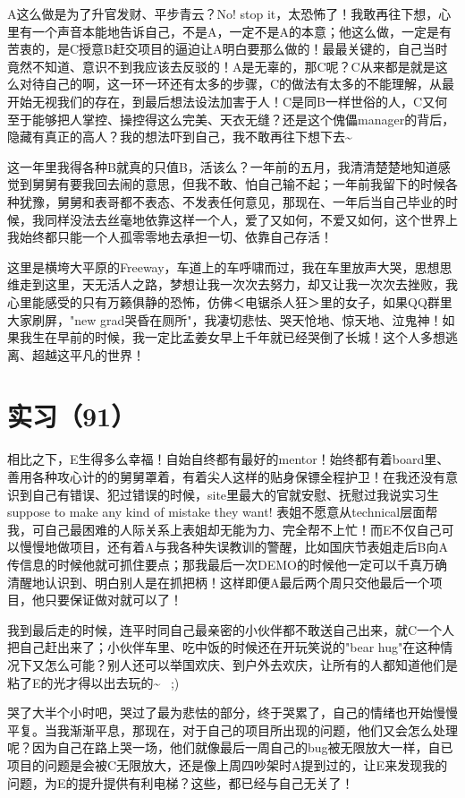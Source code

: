 \documentclass[12pt]{book}
\begin{document}
A这么做是为了升官发财、平步青云？No! stop it，太恐怖了！我敢再往下想，心里有一个声音本能地告诉自己，不是A，一定不是A的本意；他这么做，一定是有苦衷的，是C授意B赶交项目的逼迫让A明白要那么做的！最最关键的，自己当时竟然不知道、意识不到我应该去反驳的！A是无辜的，那C呢？C从来都是就是这么对待自己的啊，这一环一环还有太多的步骤，C的做法有太多的不能理解，从最开始无视我们的存在，到最后想法设法加害于人！C是同B一样世俗的人，C又何至于能够把人掌控、操控得这么完美、天衣无缝？还是这个傀儡manager的背后，隐藏有真正的高人？我的想法吓到自己，我不敢再往下想下去\textasciitilde{}~

这一年里我得各种B就真的只值B，活该么？一年前的五月，我清清楚楚地知道感觉到舅舅有要我回去闹的意思，但我不敢、怕自己输不起；一年前我留下的时候各种犹豫，舅舅和表哥都不表态、不发表任何意见，那现在、一年后当自己毕业的时候，我同样没法去丝毫地依靠这样一个人，爱了又如何，不爱又如何，这个世界上我始终都只能一个人孤零零地去承担一切、依靠自己存活！

这里是横垮大平原的Freeway，车道上的车呼啸而过，我在车里放声大哭，思想思维走到这里，天无活人之路，梦想让我一次次去努力，却又让我一次次去挫败，我心里能感受的只有万籁俱静的恐怖，仿佛＜电锯杀人狂＞里的女子，如果QQ群里大家刷屏，"new grad哭昏在厕所"，我凄切悲怯、哭天怆地、惊天地、泣鬼神！如果我生在早前的时候，我一定比孟姜女早上千年就已经哭倒了长城！这个人多想逃离、超越这平凡的世界！


\section{实习（91）　}
\label{sec-5-94}

相比之下，E生得多么幸福！自始自终都有最好的mentor！始终都有着board里、善用各种攻心计的的舅舅罩着，有着尖人这样的贴身保镖全程护卫！在我还没有意识到自己有错误、犯过错误的时候，site里最大的官就安慰、抚慰过我说实习生suppose to make any kind of mistake they want! 表姐不愿意从technical层面帮我，可自己最困难的人际关系上表姐却无能为力、完全帮不上忙！而E不仅自己可以慢慢地做项目，还有着A与我各种失误教训的警醒，比如国庆节表姐走后B向A传信息的时候他就可抓住要点；那我最后一次DEMO的时候他一定可以千真万确清醒地认识到、明白别人是在抓把柄！这样即便A最后两个周只交他最后一个项目，他只要保证做对就可以了！

我到最后走的时候，连平时同自己最亲密的小伙伴都不敢送自己出来，就C一个人把自己赶出来了；小伙伴车里、吃中饭的时候还在开玩笑说的"bear hug"在这种情况下又怎么可能？别人还可以举国欢庆、到户外去欢庆，让所有的人都知道他们是粘了E的光才得以出去玩的\textasciitilde{}~ ;)

哭了大半个小时吧，哭过了最为悲怯的部分，终于哭累了，自己的情绪也开始慢慢平复。当我渐渐平息，那现在，对于自己的项目所出现的问题，他们又会怎么处理呢？因为自己在路上哭一场，他们就像最后一周自己的bug被无限放大一样，自已项目的问题是会被C无限放大，还是像上周四吵架时A提到过的，让E来发现我的问题，为E的提升提供有利电梯？这些，都已经与自己无关了！
\end{document}
